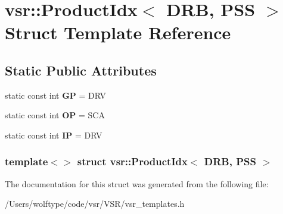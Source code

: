 \hypertarget{structvsr_1_1_product_idx_3_01_d_r_b_00_01_p_s_s_01_4}{\section{vsr\-:\-:Product\-Idx$<$ D\-R\-B, P\-S\-S $>$ Struct Template Reference}
\label{structvsr_1_1_product_idx_3_01_d_r_b_00_01_p_s_s_01_4}
}
\subsection*{Static Public Attributes}
\begin{DoxyCompactItemize}
\item 
\hypertarget{structvsr_1_1_product_idx_3_01_d_r_b_00_01_p_s_s_01_4_a7df4a848bb1c434b8be6251f258e20ef}{static const int {\bfseries G\-P} = D\-R\-V}\label{structvsr_1_1_product_idx_3_01_d_r_b_00_01_p_s_s_01_4_a7df4a848bb1c434b8be6251f258e20ef}

\item 
\hypertarget{structvsr_1_1_product_idx_3_01_d_r_b_00_01_p_s_s_01_4_ae2203e4a4c9633d660d626302f712594}{static const int {\bfseries O\-P} = S\-C\-A}\label{structvsr_1_1_product_idx_3_01_d_r_b_00_01_p_s_s_01_4_ae2203e4a4c9633d660d626302f712594}

\item 
\hypertarget{structvsr_1_1_product_idx_3_01_d_r_b_00_01_p_s_s_01_4_ab4d1368cffc742b068c878f1f363a8a0}{static const int {\bfseries I\-P} = D\-R\-V}\label{structvsr_1_1_product_idx_3_01_d_r_b_00_01_p_s_s_01_4_ab4d1368cffc742b068c878f1f363a8a0}

\end{DoxyCompactItemize}
\subsubsection*{template$<$$>$ struct vsr\-::\-Product\-Idx$<$ D\-R\-B, P\-S\-S $>$}



The documentation for this struct was generated from the following file\-:\begin{DoxyCompactItemize}
\item 
/\-Users/wolftype/code/vsr/\-V\-S\-R/vsr\-\_\-templates.\-h\end{DoxyCompactItemize}
